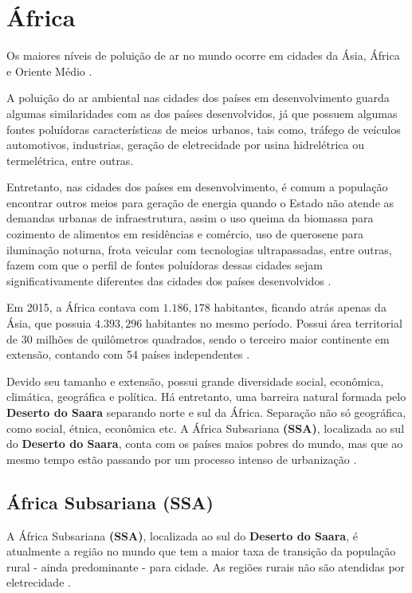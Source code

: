 \section{África}

Os maiores níveis de poluição de ar no mundo ocorre
em cidades da Ásia, África e Oriente Médio \citep{brauer2012}.   

A poluição do ar ambiental nas cidades dos países em desenvolvimento 
guarda algumas similaridades com as dos países desenvolvidos, já que 
possuem algumas fontes poluídoras características de meios urbanos, 
tais como, tráfego de veículos automotivos, industrias, geração de 
eletrecidade por usina hidrelétrica ou termelétrica, entre outras. 

Entretanto, nas cidades dos países em desenvolvimento, é comum 
a população encontrar outros meios para geração de energia quando 
o Estado não atende as demandas urbanas de infraestrutura, assim o 
uso queima da biomassa para cozimento de alimentos em residências 
e comércio, uso de querosene para iluminação noturna, frota veicular
com tecnologias ultrapassadas, entre outras, fazem com que o perfil 
de fontes poluídoras dessas cidades sejam significativamente 
diferentes das cidades dos países desenvolvidos \citep{brauer2012}.

Em 2015, a África contava com $1.186,178$ habitantes, ficando atrás 
apenas da Ásia, que possuia $4.393,296$ habitantes no mesmo período. 
Possui área territorial de 30 milhões de quilômetros quadrados, sendo
o terceiro maior continente em extensão, contando com 54 países 
independentes \citep{UN}.

Devido seu tamanho e extensão, possui grande diversidade social, 
econômica, climática, geográfica e política. 
Há entretanto, uma barreira natural formada pelo \textbf{Deserto do Saara}
separando norte e sul da África. Separação não só geográfica, como
social, étnica, econômica etc. 
A África Subsariana \textbf{(SSA)}, localizada ao sul do \textbf{Deserto do Saara}, 
conta com os países maios pobres do mundo, mas que ao mesmo tempo estão
passando por um processo intenso de urbanização \citep{UN}. 
   	
\subsection{África Subsariana \textbf{(SSA)}}

A África Subsariana \textbf{(SSA)}, localizada ao sul do 
\textbf{Deserto do Saara}, é atualmente a região no mundo que tem a maior 
taxa de transição da população rural - ainda predominante - para cidade. 
As regiões rurais não são atendidas por eletrecidade \citep{MONTGOMERY2008}.

